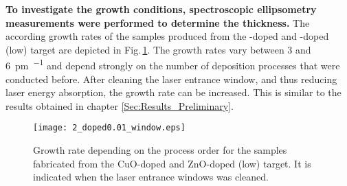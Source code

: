 \textbf{To investigate the growth conditions, spectroscopic ellipsometry measurements were performed to determine the thickness.}
The according growth rates of the samples produced from the -doped and -doped (low) target are depicted in Fig.\,\ref{Fig:Results_2_windowCleaning}.
The growth rates vary between 3 and \qty{6}{\pm\per\pulse} and depend strongly on the number of deposition processes that were conducted before.
After cleaning the laser entrance window, and thus reducing laser energy absorption, the growth rate can be increased.
This is similar to the results obtained in chapter \ref{Sec:Results_Preliminary}. 
\begin{figure}
    \centering
    \texttt{[image: 2\_doped0.01\_window.eps]}
    \caption{
        Growth rate depending on the process order for the samples fabricated from the CuO-doped and ZnO-doped (low) target.
        It is indicated when the laser entrance windows was cleaned.
    }
    \label{Fig:Results_2_windowCleaning}
\end{figure}

